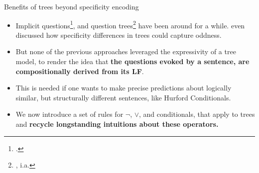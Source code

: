 \documentclass[10pt]{beamer}
\newcommand{\footciteia}[1]{\footnote{\cite{#1}, i.a.}}
\begin{document}
\begin{frame}{Benefits of trees beyond specificity encoding}
	\begin{itemize}
		\item Implicit questions\footcite{Carlson1985,vonStutterheim1989,vanKuppevelt1995a,vanKuppevelt1995b,Ginzburg1996,Ginzburg2012}, and question trees\footciteia{Roberts1996,Buring2003,Riester2019,Onea2016,Zhang2022,Ippolito2019} have been around for a while. \citet{Ippolito2019} even discussed how specificity differences in trees could capture oddness.
		\item But none of the previous approaches leveraged the expressivity of a tree model, to render the idea that \textbf{the questions evoked by a sentence, are compositionally derived from its LF}.
		\item This is needed if one wants to make precise predictions about logically similar, but structurally different sentences, like Hurford Conditionals.
		\item We now introduce a set of rules for $\neg$, $\vee$, and conditionals, that apply to trees and \textbf{recycle longstanding intuitions about these operators.}
	\end{itemize}\vspace{2mm}
\end{frame}
\end{document}

